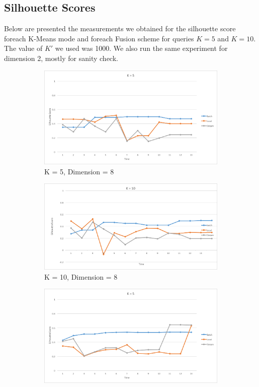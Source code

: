 \documentclass{lmproj}
\begin{document}
\subsection{Silhouette Scores}

Below are presented the measurements we obtained for the silhouette score foreach K-Means mode and foreach Fusion scheme for queries $K  = 5$ and $K = 10$. The value of $K'$ we used was 1000. We also run the same experiment for dimension 2, mostly for sanity check.

\begin{figure}[H]
	\begin{subfigure}{.5\textwidth}
		\centering
		\includegraphics[width=.8\linewidth]{silhouette/silhouette_50_50_k_5_dim_8}
		\caption*{K = 5, Dimension = 8}
		\label{fig:silhouette_50_50_k_5_dim_8}
	\end{subfigure}%
	\begin{subfigure}{.5\textwidth}
		\centering
		\includegraphics[width=.8\linewidth]{silhouette/silhouette_50_50_k_10_dim_8}
		\caption*{K = 10, Dimension = 8}
		\label{fig:silhouette_50_50_k_10_dim_8}
	\end{subfigure}
	\begin{subfigure}{.5\textwidth}
		\centering
		\includegraphics[width=.8\linewidth]{silhouette/silhouette_50_50_k_5_dim_2}

\end{subfigure}
\end{figure}
\end{document}
